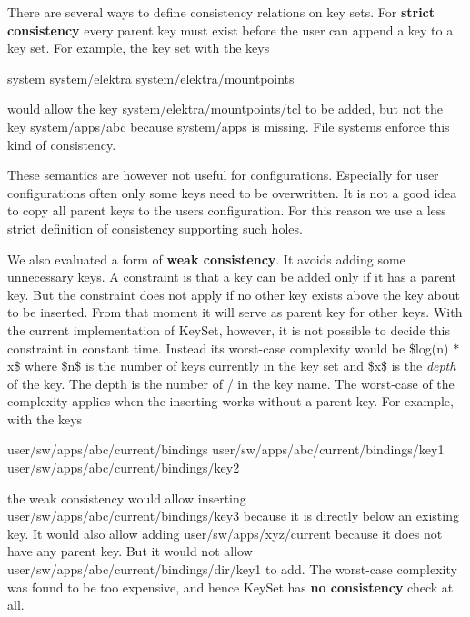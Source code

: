There are several ways to define consistency relations on key sets. For {\bfseries strict consistency} every parent key must exist before the user can append a key to a key set. For example, the key set with the keys


\begin{DoxyCode}
system
system/elektra
system/elektra/mountpoints
\end{DoxyCode}


would allow the key {\ttfamily system/elektra/mountpoints/tcl} to be added, but not the key {\ttfamily system/apps/abc} because {\ttfamily system/apps} is missing. File systems enforce this kind of consistency.

These semantics are however not useful for configurations. Especially for user configurations often only some keys need to be overwritten. It is not a good idea to copy all parent keys to the users configuration. For this reason we use a less strict definition of consistency supporting such holes.

We also evaluated a form of {\bfseries weak consistency}. It avoids adding some unnecessary keys. A constraint is that a key can be added only if it has a parent key. But the constraint does not apply if no other key exists above the key about to be inserted. From that moment it will serve as parent key for other keys. With the current implementation of {\ttfamily Key\+Set}, however, it is not possible to decide this constraint in constant time. Instead its worst-\/case complexity would be \$log(n) $\ast$ x\$ where \$n\$ is the number of keys currently in the key set and \$x\$ is the {\itshape depth} of the key. The depth is the number of {\ttfamily /} in the key name. The worst-\/case of the complexity applies when the inserting works without a parent key. For example, with the keys


\begin{DoxyCode}
user/sw/apps/abc/current/bindings
user/sw/apps/abc/current/bindings/key1
user/sw/apps/abc/current/bindings/key2
\end{DoxyCode}


the weak consistency would allow inserting {\ttfamily user/sw/apps/abc/current/bindings/key3} because it is directly below an existing key. It would also allow adding {\ttfamily user/sw/apps/xyz/current} because it does not have any parent key. But it would not allow {\ttfamily user/sw/apps/abc/current/bindings/dir/key1} to add. The worst-\/case complexity was found to be too expensive, and hence {\ttfamily Key\+Set} has {\bfseries no consistency} check at all.

